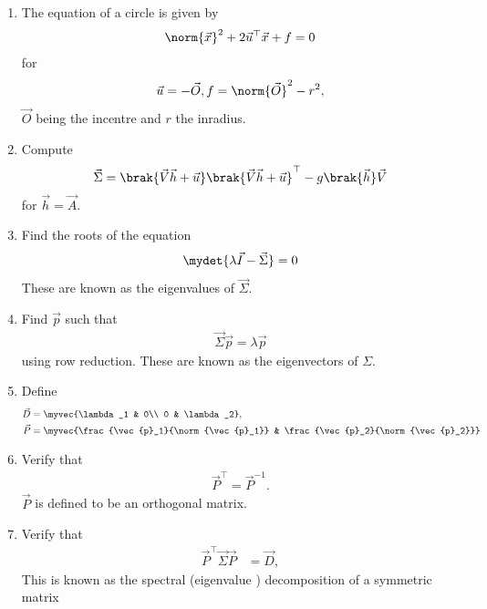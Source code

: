 \begin{enumerate}[label=\thesubsection.\arabic*.,ref=\thesubsection.\theenumi]
\item 
	 The equation of a circle is given by 
	\label{prop:circ-eq}
\begin{align}
	\norm{\vec{x}}^2 + 2 \vec{u}^{\top}\vec{x} + f = 0
	\label{eq:circ-eq}
\end{align}
for
		\begin{align}
			 \label{eq:conic_quad_form-params}
	 \vec{u}=-\vec{O}, f = \norm{\vec{O}}^2-r^2,
		\end{align}
		$\vec{O}$ being the incentre and $r$ the inradius.  
\item Compute 
\begin{align}
	\label{eq:incircle-disc-Sigma}
\vec{\Sigma} = 
\brak{\vec{V}\vec{h}+\vec{u}}
	  \brak{\vec{V}\vec{h}+\vec{u}}^{\top}
   -
	  {g}\brak{\vec{h}}\vec{V}
\end{align}
for $\vec{h}=\vec{A}$.
\item Find the roots of the equation
\begin{align}
	\mydet{\lambda \vec{I}-\vec{\Sigma}} = 0
\end{align}
These are known as the eigenvalues of $\vec{\Sigma}$.
\item Find $\vec{p}$  such that 
\begin{align}
	\vec{\Sigma}\vec{p}
	=\lambda\vec{p}
\end{align}
using row reduction.  These are known as the eigenvectors of $\Sigma$.
\item Define
    \begin{align}
      \label{eq:conic_parmas_eig_def-D}
      \vec{D} &= \myvec{\lambda_1 & 0\\ 0 & \lambda_2}, 
      \\
	    \vec{P} &= \myvec{\frac{\vec{p}_1}{\norm{\vec{p}_1}} & \frac{\vec{p}_2}{\norm{\vec{p}_2}}}
      \label{eq:eigevecP}
    \end{align}
    \item Verify that
  \begin{align}
\vec{P}^{\top}=\vec{P}^{-1}.
  \label{eq:orth-mat}
  \end{align}
  $\vec{P}$ is defined to be an orthogonal matrix.
\item Verify that
    \begin{align}
      \label{eq:conic_parmas_eig_def}
      \vec{P}^{\top}\vec{\Sigma}\vec{P} &= \vec{D},
    \end{align} 
		This is known as the spectral (eigenvalue ) decomposition of a symmetric matrix 


\end{enumerate}

